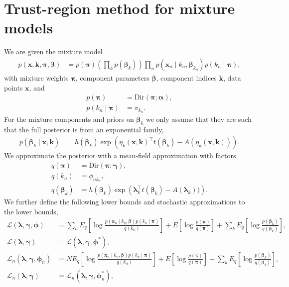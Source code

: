 \documentclass[a4paper]{article}
\begin{document}
	\section*{Trust-region method for mixture models}
		We are given the mixture model
		\begin{align}
			p(\mathbf{x}, \mathbf{k}, \bm{\pi}, \bm{\beta})
			&= p(\bm{\pi}) \left( \prod_k p(\bm{\beta}_k) \right) \prod_n p(\mathbf{x}_n \mid k_n, \bm{\beta}_{k_n}) p(k_n \mid \bm{\pi}),
		\end{align}
		with mixture weights $\bm{\pi}$, component parameters $\bm{\beta}$, component indices $\mathbf{k}$, data points $\mathbf{x}$, and
		\begin{align}
			p(\bm{\pi}) &= \text{Dir}(\bm{\pi}; \bm{\alpha}), \\
			p(k_n \mid \bm{\pi}) &= \pi_{k_n}.
		\end{align}
		For the mixture components and priors on $\bm{\beta}_k$ we only assume that they are such that the full posterior is from an exponential family,
		\begin{align}
			p(\bm{\beta}_{k} \mid \mathbf{x}, \bm{k}) &= h(\bm{\beta}_k) \exp\left(\eta_k(\mathbf{x}, \bm{k})^\top t(\bm{\beta}_k) - A(\eta_k(\mathbf{x}, \bm{k}))\right).
		\end{align}
		We approximate the posterior with a mean-field approximation with factors
		\begin{align}
			q(\bm{\pi}) &= \text{Dir}(\bm{\pi}; \bm{\gamma}), \\
			q(k_n) &= \phi_{nk_n}, \\
			q(\bm{\beta}_k) &= h(\bm{\beta}_k) \exp\left(\bm{\lambda}_k^\top t(\bm{\beta}_k) - A(\bm{\lambda}_k))\right).
		\end{align}
		We further define the following lower bounds and stochastic approximations to the lower bounds,
		\begin{align}
			\mathcal{L}(\bm{\lambda}, \bm{\gamma}, \bm{\phi})
			&= \sum_n E_q\left[ \log \frac{p(\mathbf{x}_n \mid k_n, \bm{\beta}) p(k_n \mid \bm{\pi})}{q(k_n)} \right]
			+ E\left[\log \frac{p(\bm{\pi})}{q(\bm{\pi})}\right] + \sum_k E_q\left[\log \frac{p(\bm{\beta}_k)}{q(\bm{\beta}_k)}\right], \\
			\mathcal{L}(\bm{\lambda}, \bm{\gamma})
			&= \mathcal{L}(\bm{\lambda}, \bm{\gamma}, \bm{\phi}^*), \\
			\mathcal{L}_n(\bm{\lambda}, \bm{\gamma}, \bm{\phi}_n)
			&= N E_q\left[ \log \frac{p(\mathbf{x}_n \mid k_n, \bm{\beta}) p(k_n \mid \bm{\pi})}{q(k_n)} \right]
			+ E\left[\log \frac{p(\bm{\pi})}{q(\bm{\pi})}\right] + \sum_k E_q\left[\log \frac{p(\bm{\beta}_k)}{q(\bm{\beta}_k)}\right], \\
			\mathcal{L}_n(\bm{\lambda}, \bm{\gamma})
			&= \mathcal{L}_n(\bm{\lambda}, \bm{\gamma}, \bm{\phi}_n^*),
		\end{align}
\end{document}

